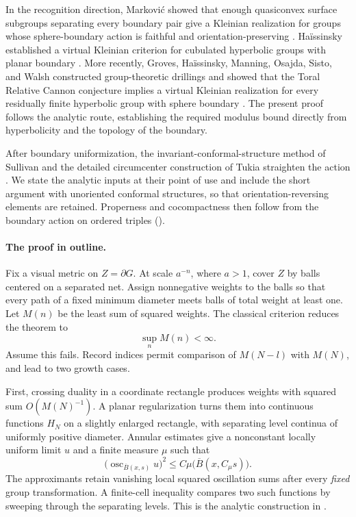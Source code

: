 \documentclass[11pt]{article}
\numberwithin{equation}{section}
\theoremstyle{definition}
\theoremstyle{remark}
\DeclareMathOperator{\osc}{osc}
\begin{document}
In the recognition direction, Markovi\'c showed that enough
quasiconvex surface subgroups separating every boundary pair give a
Kleinian realization for groups whose sphere-boundary action is faithful
and orientation-preserving \cite[Theorem 1.1]{Markovic}.
Ha\"issinsky established a virtual Kleinian criterion for cubulated
hyperbolic groups with planar boundary \cite[Theorem 1.10]{Haissinsky}.
More recently, Groves, Ha\"issinsky, Manning, Osajda, Sisto, and Walsh
constructed group-theoretic drillings and showed that the Toral Relative
Cannon conjecture implies a virtual Kleinian realization for every
residually finite hyperbolic group with sphere boundary
\cite[Theorems A--B and Corollary C]{Drilling}.
The present proof follows the analytic route, establishing the required
modulus bound directly from hyperbolicity and the topology of the boundary.

After boundary uniformization, the invariant-conformal-structure method
of Sullivan and the detailed circumcenter construction of Tukia
straighten the action \cite{Sullivan,Tukia}.
We state the analytic inputs at their point of use and include the
short argument with unoriented conformal structures, so that
orientation-reversing elements are retained. Properness and
cocompactness then follow from the boundary action on ordered triples
().

\paragraph{The proof in outline.}
Fix a visual metric on $Z=\partial G$. At scale $a^{-n}$, where $a>1$,
cover $Z$ by balls centered on a separated net. Assign nonnegative
weights to the balls so that every path of a fixed minimum diameter
meets balls of total weight at least one. Let $M(n)$ be the least sum
of squared weights. The classical criterion reduces the theorem to
\[
 \sup_n M(n)<\infty.
\]
Assume this fails. Record indices permit comparison of $M(N-l)$
with $M(N)$, and lead to two growth cases.

First, crossing duality in a coordinate rectangle produces weights
with squared sum $O(M(N)^{-1})$. A planar regularization turns them
into continuous functions $H_N$ on a slightly enlarged rectangle,
with separating level continua of uniformly positive diameter.
Annular estimates give a nonconstant locally uniform limit $u$ and
a finite measure $\mu$ such that
\[
 \bigl(\osc_{\overline B(x,s)}u\bigr)^2
 \le C\mu\bigl(\overline B(x,C_\mu s)\bigr).
\]
The approximants retain vanishing local squared oscillation sums
after every \emph{fixed} group transformation. A finite-cell
inequality compares two such functions by sweeping through the
separating levels. This is the analytic construction in
.
\end{document}
